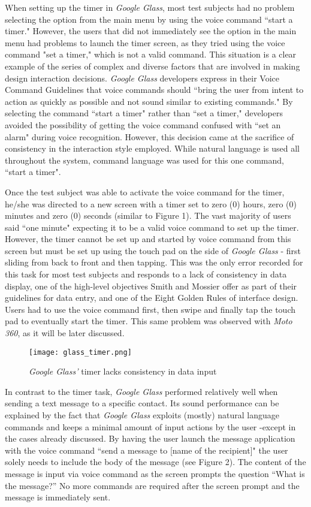 \documentclass[11pt,a4paper]{scrartcl}
\begin{document}
When setting up the timer in \textit{Google Glass}, most test subjects had no problem selecting the option from the main menu by using the voice command ``start a timer." However, the users that did not immediately see the option in the main menu had problems to launch the timer screen, as they tried using the voice command "set a timer," which is not a valid command. This situation is a clear example of the series of complex and diverse factors that are involved in making design interaction decisions. \textit{Google Glass} developers express in their Voice Command Guidelines that voice commands should ``bring the user from intent to action as quickly as possible and not sound similar to existing commands."\cite{google02} By selecting the command ``start a timer" rather than ``set a timer," developers avoided the possibility of getting the voice command confused with ``set an alarm" during voice recognition. However, this decision came at the sacrifice of consistency in the interaction style employed. While natural language is used all throughout the system, command language was used for this one command, ``start a timer".

Once the test subject was able to activate the voice command for the timer, he/she was directed to a new screen with a timer set to zero (0) hours, zero (0) minutes and zero (0) seconds (similar to  Figure 1). The vast majority of users said ``one minute" expecting it to be a valid voice command to set up the timer. However, the timer cannot be set up and started by voice command from this screen but must be set up using the touch pad on the side of \textit{Google Glass} - first sliding from back to front and then tapping. This was the only error recorded for this task for most test subjects and responds to a lack of consistency in data display, one of the high-level objectives Smith and Mossier offer as part of their guidelines for data entry, and one of the Eight Golden Rules of interface design.\cite{plaisant09} Users had to use the voice command first, then swipe and finally tap the touch pad to eventually start the timer. This same problem was observed with \textit{Moto 360}, as it will be later discussed.

\begin{figure}[h]
\centering
\texttt{[image: glass\_timer.png]}
\caption{\textit{Google Glass'} timer lacks consistency in data input}
\end{figure}


In contrast to the timer task, \textit{Google Glass} performed relatively well when sending a text message to a specific contact. Its sound performance can be explained by the fact that \textit{Google Glass} exploits (mostly) natural language commands and keeps a minimal amount of input actions by the user -except in the cases already discussed. By having the user launch the message application with the voice command ``send a message to [name of the recipient]" the user solely needs to include the body of the message (see Figure 2). The content of the message is input via voice command as the screen prompts the question ``What is the message?” No more commands are required after the screen prompt and the message is immediately sent.
\end{document}

